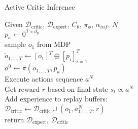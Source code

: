 \begin{algorithm}[H]
    \caption{Active Critic Inference}
    \label{AC_Inference}
    \Require Given $\mathcal{D}_{\text{critic}}$, $\mathcal{D}_{\text{expert}}$,  
    $C_{\theta}$, $\pi_{\phi}$, $\alpha_{inf}$, $N$\\
    \State $p_a \gets 0^{T \times d_p}$ \hfill{} \\
    \State sample $o_1$ from MDP\\
    \State $\tilde{o}_{1, ..., T} \gets [o_1]^T \oplus [p_i]_{i=1}^T$ \hfill{} \\
    \State $a^0 \gets \pi(\tilde{o}_{1, ..., T}, p_a)$\hfill{} \\
    \State Execute actions sequence $a^N$\\
    \State Get reward $r$ based on final state $s_t \propto a^N$\\
    \State Add experience to replay buffers:\\
    \State $\mathcal{D}_{\text{critic}} \gets \mathcal{D}_{\text{critic}} \cup (o_1, a^N_{1, ..., T}, r)$\\
    return $\mathcal{D}_{\text{expert}}$, $\mathcal{D}_{\text{critic}}$
\end{algorithm}

